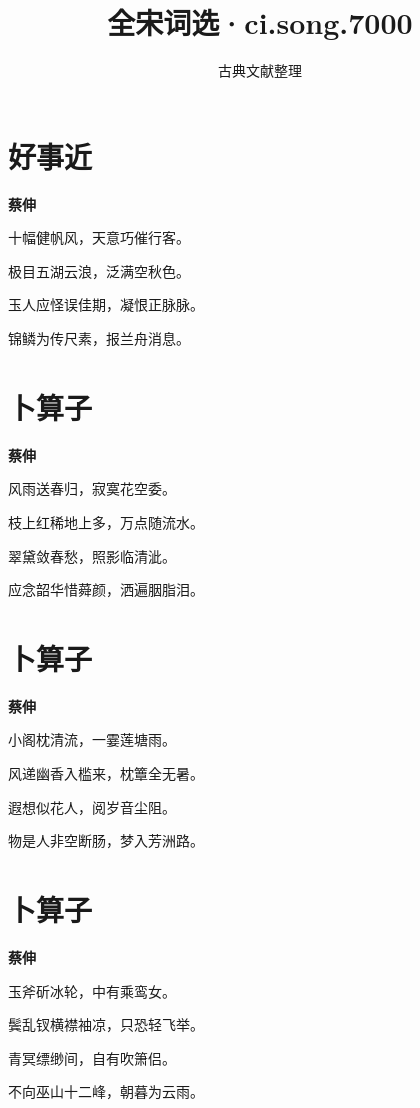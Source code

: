 \documentclass[12pt,a4paper]{ctexbook}
\title{全宋词选·ci.song.7000}
\author{古典文献整理}
\date{}
\begin{document}
\maketitle
\tableofcontents
\newpage
\section{好事近}
\textbf{蔡伸}\par\vspace{0.5em}
十幅健帆风，天意巧催行客。\par
极目五湖云浪，泛满空秋色。\par
玉人应怪误佳期，凝恨正脉脉。\par
锦鳞为传尺素，报兰舟消息。\par

\section{卜算子}
\textbf{蔡伸}\par\vspace{0.5em}
风雨送春归，寂寞花空委。\par
枝上红稀地上多，万点随流水。\par
翠黛敛春愁，照影临清泚。\par
应念韶华惜蕣颜，洒遍胭脂泪。\par

\section{卜算子}
\textbf{蔡伸}\par\vspace{0.5em}
小阁枕清流，一霎莲塘雨。\par
风递幽香入槛来，枕簟全无暑。\par
遐想似花人，阅岁音尘阻。\par
物是人非空断肠，梦入芳洲路。\par

\section{卜算子}
\textbf{蔡伸}\par\vspace{0.5em}
玉斧斫冰轮，中有乘鸾女。\par
鬓乱钗横襟袖凉，只恐轻飞举。\par
青冥缥缈间，自有吹箫侣。\par
不向巫山十二峰，朝暮为云雨。\par
\end{document}
